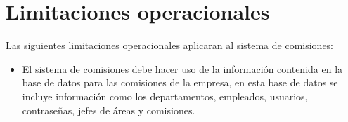 \section{Limitaciones operacionales}

Las siguientes limitaciones operacionales aplicaran al sistema de comisiones:

\begin{itemize} 
	\item El sistema de comisiones debe hacer uso de la información contenida en la base de datos para las comisiones de la empresa, en esta base de datos se incluye información como los departamentos, empleados, usuarios, contraseñas, jefes de áreas y comisiones.
\end{itemize}